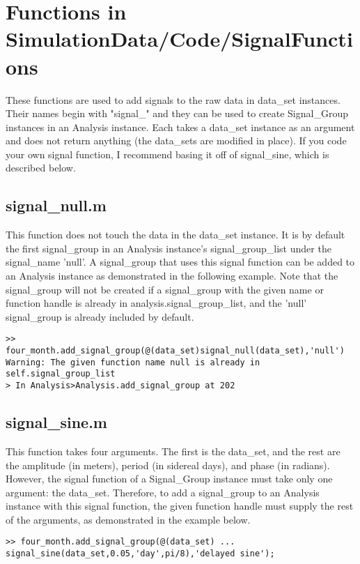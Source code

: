 \documentclass[12pt]{report}
\begin{document}
\chapter{Functions in SimulationData/Code/SignalFunctions}
\label{chap:SignalFunctions}
These functions are used to add signals to the raw data in data\_set instances.  Their names begin with "signal\_" and they can be used to create Signal\_Group instances in an Analysis instance.  Each takes a data\_set instance as an argument and does not return anything (the data\_sets are modified in place).  If you code your own signal function, I recommend basing it off of signal\_sine, which is described below.

\section{signal\_null.m}
This function does not touch the data in the data\_set instance.  It is by default the first signal\_group in an Analysis instance's signal\_group\_list under the signal\_name 'null'.  A signal\_group that uses this signal function can be added to an Analysis instance as demonstrated in the following example.  Note that the signal\_group will not be created if a signal\_group with the given name or function handle is already in analysis.signal\_group\_list, and the 'null' signal\_group is already included by default.

\begin{verbatim}
>> four_month.add_signal_group(@(data_set)signal_null(data_set),'null')
Warning: The given function name null is already in self.signal_group_list 
> In Analysis>Analysis.add_signal_group at 202 
\end{verbatim}

\section{signal\_sine.m}
This function takes four arguments.  The first is the data\_set, and the rest are the amplitude (in meters), period (in sidereal days), and phase (in radians).  However, the signal function of a Signal\_Group instance must take only one argument: the data\_set.  Therefore, to add a signal\_group to an Analysis instance with this signal function, the given function handle must supply the rest of the arguments, as demonstrated in the example below.

\begin{verbatim}
>> four_month.add_signal_group(@(data_set) ...
signal_sine(data_set,0.05,'day',pi/8),'delayed sine');
\end{verbatim}
\end{document}
